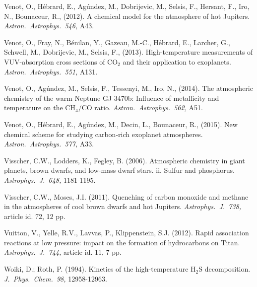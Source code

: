 \documentclass[preprint]{aastex6}
\newcounter{reaction}
\begin{document}
\begin{thebibliography}{00}
 
Venot, O., H{\'e}brard, E., Ag{\'u}ndez, M., Dobrijevic, M., Selsis, F., Hersant, F., Iro, N., Bounaceur, R., (2012).
A chemical model for the atmosphere of hot Jupiters.
{\em Astron.\ Astrophys.\ 546,} A43.

Venot, O., Fray, N., B{\'e}nilan, Y., Gazeau, M.-C., H{\'e}brard, E., Larcher, G., Schwell, M., Dobrijevic, M., Selsis, F., (2013).
High-temperature measurements of VUV-absorption cross sections of CO$_{2}$ and their application to exoplanets.
{\em Astron.\ Astrophys.\ 551,} A131.

Venot, O., Ag{\'u}ndez, M., Selsis, F., Tessenyi, M., Iro, N., (2014).
The atmospheric chemistry of the warm {Neptune} {GJ} 3470b: {Influence} of metallicity and temperature on the {CH$_{4}$/CO} ratio.
{\em Astron.\ Astrophys.\ 562,} A51.

Venot, O., H{\'e}brard, E., Ag{\'u}ndez, M., Decin, L., Bounaceur, R., (2015).
New chemical scheme for studying carbon-rich exoplanet atmospheres.
{\em Astron.\ Astrophys.\ 577,} A33.

Visscher, C.W., Lodders, K., Fegley, B. (2006).
Atmospheric chemistry in giant planets, brown dwarfs, and low-mass dwarf stars. ii. Sulfur and phosphorus.
{\em Astrophys.\ J.\ 648,} 1181-1195.

Visscher, C.W., Moses, J.I. (2011).
Quenching of carbon monoxide and methane in the atmospheres of cool brown dwarfs and hot Jupiters. 
{\em Astrophys.\ J.\ 738,} article id. 72, 12 pp.


 Vuitton, V., Yelle, R.V., Lavvas, P., Klippenstein, S.J. (2012).
Rapid association reactions at low pressure: impact on the formation of hydrocarbons on Titan.
{\em Astrophys.\ J.\ 744,} article id. 11, 7 pp.

Woiki, D.; Roth, P. (1994).
Kinetics of the high-temperature H$_2$S decomposition.
{\em J.\ Phys.\ Chem.\ 98,} 12958-12963.


\end{thebibliography}
\end{document}
